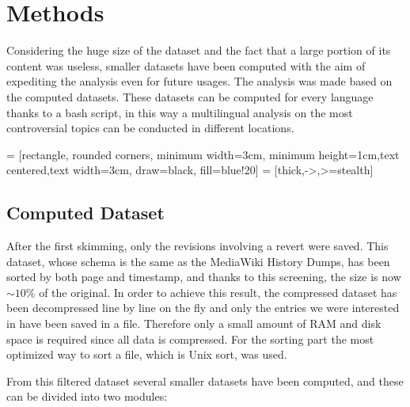 \chapter{Methods}

Considering the huge size of the dataset and the fact that a large portion of its content was
useless, smaller datasets have been computed with the aim of expediting the analysis even for future
usages. The analysis was made based on the computed datasets. These datasets can be computed for
every language thanks to a bash script, in this way a multilingual analysis on the most
controversial topics can be conducted in different locations.


\bigskip



 = [rectangle, rounded corners, minimum width=3cm, minimum height=1cm,text centered,text width=3cm, draw=black, fill=blue!20]
 = [thick,->,>=stealth]


\bigskip

\section{Computed Dataset}
After the first skimming, only the revisions involving a revert were saved. This dataset, whose
schema is the same as the MediaWiki History Dumps, has been sorted by both page and timestamp, and
thanks to this screening, the size is now $\sim 10\%$ of the original. In order to achieve this result,
the compressed dataset has been decompressed line by line on the fly and only the entries we were
interested in have been saved in a file. Therefore only a small amount of RAM and disk space is
required since all data is compressed. For the sorting part the most optimized way to sort a file,
which is Unix sort, was used.  

From this filtered dataset several smaller datasets have been computed, and these can be divided into two modules: 

